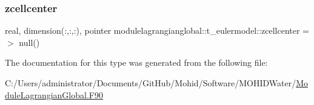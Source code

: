 \mbox{\label{structmodulelagrangianglobal_1_1t__eulermodel_add3e02d1516db39f83bfba09b6892b92}} 
\subsubsection{\texorpdfstring{zcellcenter}{zcellcenter}}
{\footnotesize\ttfamily real, dimension(\+:,\+:,\+:), pointer modulelagrangianglobal\+::t\+\_\+eulermodel\+::zcellcenter =$>$ null()\hspace{0.3cm}{\ttfamily [private]}}



The documentation for this type was generated from the following file\+:\begin{DoxyCompactItemize}
\item 
C\+:/\+Users/administrator/\+Documents/\+Git\+Hub/\+Mohid/\+Software/\+M\+O\+H\+I\+D\+Water/\mbox{\hyperlink{_module_lagrangian_global_8_f90}{Module\+Lagrangian\+Global.\+F90}}\end{DoxyCompactItemize}
